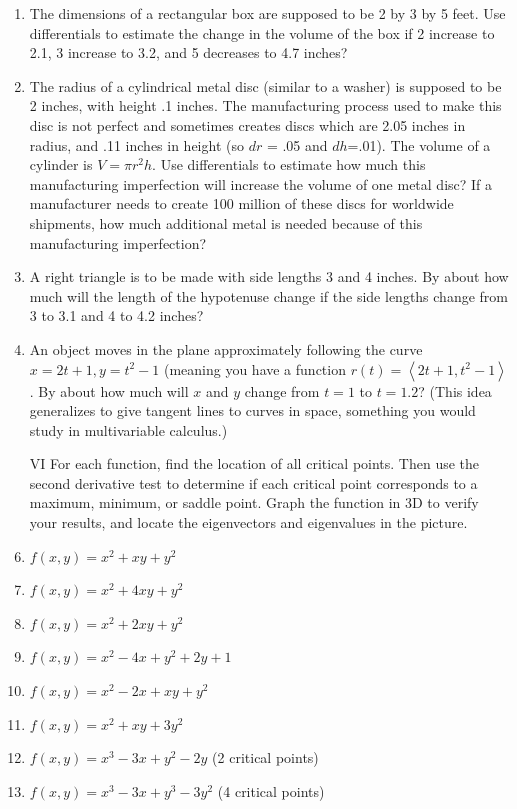 \documentclass[10pt]{amsart}
\begin{document}
\begin{multicols}{2}
\begin{enumerate}
\item The dimensions of a rectangular box are supposed to be 2 by 3 by 5 feet. Use differentials to estimate the change in the volume of the box if 2 increase to 2.1, 3 increase to 3.2, and 5 decreases to 4.7 inches? 
\item The radius of a cylindrical metal disc (similar to a washer) is supposed to be 2 inches, with height .1 inches. The manufacturing process used to make this disc is not perfect and sometimes creates discs which are 2.05 inches in radius, and .11 inches in height (so $dr$ = .05 and $dh$=.01). The volume of a cylinder is $V=\pi r^2 h$. Use differentials to estimate how much this manufacturing imperfection will increase the volume of one metal disc? If a manufacturer needs to create 100 million of these discs for worldwide shipments, how much additional metal is needed because of this manufacturing imperfection? 
\item A right triangle is to be made with side lengths 3 and 4 inches.  By about how much will the length of the hypotenuse change if the side lengths change from 3 to 3.1 and 4 to 4.2 inches? 
\item An object moves in the plane approximately following the curve $x=2t+1 , y=t^2-1$ (meaning you have a function $r(t)=\left<2t+1,t^2-1\right>$.  By about how much will $x$ and $y$ change from $t=1$ to $t=1.2$? (This idea generalizes to give tangent lines to curves in space, something you would study in multivariable calculus.)






\vspace{.3in}
\item[VI] For each function, find the location of all critical points. Then use the second derivative test to determine if each critical point corresponds to a maximum, minimum, or saddle point. Graph the function in 3D to verify your results, and locate the eigenvectors and eigenvalues in the picture.
\item $f(x,y) = x^2+xy+y^2$
\item $f(x,y) = x^2+4xy+y^2$
\item $f(x,y) = x^2+2xy+y^2$
\item $f(x,y) = x^2-4x+y^2+2y+1$
\item $f(x,y) = x^2-2x+xy+y^2$
\item $f(x,y) = x^2+xy+3y^2$
\item $f(x,y) = x^3-3x+y^2-2y$ (2 critical points)
\item $f(x,y) = x^3-3x+y^3-3y^2$ (4 critical points)






\end{enumerate}
\end{multicols}
\end{document}
